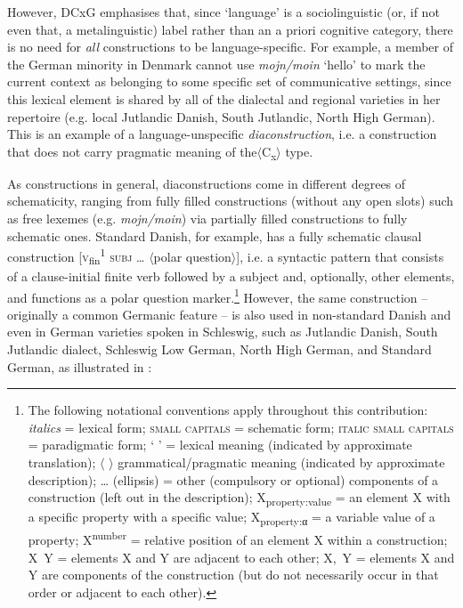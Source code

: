 \documentclass[output=paper]{langsci/langscibook}
\begin{document}
However, DCxG emphasises that, since ‘language’ is a sociolinguistic (or, if not even that, a metalinguistic) label rather than an a priori cognitive category, there is no need for \textit{all} constructions to be language-specific. For example, a member of the German minority in Denmark cannot use \textit{mojn/moin} ‘hello’ to mark the current context as belonging to some specific set of communicative settings, since this lexical element is shared by all of the dialectal and regional varieties in her repertoire (e.g. local Jutlandic Danish, South Jutlandic, North High German). This is an example of a language-unspecific \textit{diaconstruction}, i.e. a construction that does not carry pragmatic meaning of the$\langle$C\textsubscript{x}$\rangle$ type.

As constructions in general, diaconstructions come in different degrees of schematicity, ranging from fully filled constructions (without any open slots) such as free lexemes (e.g. \textit{mojn/moin}) via partially filled constructions to fully schematic ones. Standard Danish, for example, has a fully schematic clausal construction {[}\textsc{v}\textsubscript{fin}\textsuperscript{1} \textsc{subj} … $\langle$polar question$\rangle${]}, i.e. a syntactic pattern that consists of a clause-initial finite verb followed by a subject and, optionally, other elements, and functions as a polar question marker.\footnote{The following notational conventions apply throughout this contribution: \textit{italics} = lexical form; \textsc{small} \textsc{capitals} = schematic form; \textsc{italic} \textsc{small} \textsc{capitals} = paradigmatic form; ‘ ’ = lexical meaning (indicated by approximate translation); {$\langle$} {$\rangle$} grammatical/pragmatic meaning (indicated by approximate description); … (ellipsis) = other (compulsory or optional) components of a construction (left out in the description); X\textsubscript{property:value} = an element X with a specific property with a specific value; X\textsubscript{property:α} = a variable value of a property; X\textsuperscript{number} = relative position of an element X within a construction; X~Y = elements X and Y are adjacent to each other; X,~Y = elements X and Y are components of the construction (but do not necessarily occur in that order or adjacent to each other).} However, the same construction – {originally a common Germanic feature –} is also used in non-standard Danish and even in German varieties spoken in Schleswig, such as Jutlandic Danish, South Jutlandic dialect, Schleswig Low German, North High German, and Standard German, as illustrated in :
\end{document}
